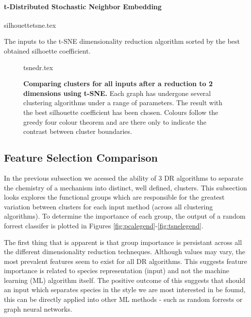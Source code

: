 \paragraph*{t-Distributed Stochastic Neighbor Embedding}

\begin{table}[H]
    \centering
        {silhouettetsne.tex}
        \caption{The inputs to the t-SNE dimensionality reduction algorithm sorted by the best obtained silhoette coefficient.  }
        \label{tab:tsnesil}
\end{table}




\begin{landscape}
\begin{figure}[H]
    {tsnedr.tex}
    \caption{\textbf{Comparing clusters for all inputs after a reduction to 2 dimensions using t-SNE.}
    Each graph has undergone several clustering algorithms under a range of parameters. The result with the best silhouette coefficient has been chosen. Colours follow the greedy four colour theorem and are there only to indicate the contrast between cluster boundaries.}
    \label{fig:tsnevis}
\end{figure}
\end{landscape}



\subsection{Feature Selection Comparison}\label{sec:fsclust}

In the previous subsection we acessed the ability of 3 DR algorithms to separate the chemistry of a mechanism into distinct, well defined, clusters. This subsection looks explores the functional groups which are responsible for the greatest variation between clusters for each input method (across all clustering algorithms). To determine the importance of each group, the output of a random forrest classifer is plotted in Figures \ref{fig:pcalegend}-\ref{fig:tsnelegend}.

The first thing that is apparent is that group importance is persistant across all the different dimensionality reduction techneques. Although values may vary, the most prevalent features seem to exist for all DR algorithms. This suggests feature importance is related to species representation (input) and not the machine learning (ML) algorithm itself. The positive outcome of this suggests that should an input which separates species in the style we are most interested in be foumd, this can be directly applied into other ML methods - such as random forrests or graph neural networks.

